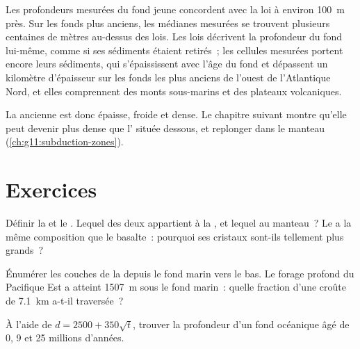 Les profondeurs mesurées du fond jeune concordent avec la loi à environ
\qty{100}{m} près. Sur les fonds plus anciens, les médianes mesurées se
trouvent plusieurs centaines de mètres au-dessus des lois. Les lois
décrivent la profondeur du fond lui-même, comme si ses sédiments étaient
retirés~; les cellules mesurées portent encore leurs sédiments, qui
s'épaississent avec l'âge du fond et dépassent un kilomètre d'épaisseur sur
les fonds les plus anciens de l'ouest de l'Atlantique Nord, et elles
comprennent des monts sous-marins et des plateaux volcaniques.

La  ancienne est donc épaisse, froide et dense. Le
chapitre suivant montre qu'elle peut devenir plus dense que l'
située dessous, et replonger dans le manteau (\cref{ch:g11:subduction-zones}).

\section{Exercices}

\begin{exercise}[$\star$]\label{exo:g11:ocean-ridges:1}
Définir la  et le . Lequel des deux appartient à la , et lequel au manteau~? Le  a la même composition que le
basalte~: pourquoi ses cristaux sont-ils tellement plus grands~?
\end{exercise}

\begin{exercise}[$\star$]\label{exo:g11:ocean-ridges:2}
Énumérer les couches de la  depuis le fond marin vers
le bas. Le forage profond du Pacifique Est a atteint \qty{1507}{m} sous le
fond marin~: quelle fraction d'une croûte de \qty{7.1}{km} a-t-il
traversée~?
\end{exercise}

\begin{exercise}[$\star$]\label{exo:g11:ocean-ridges:3}
À l'aide de $d = 2500 + 350\sqrt{t}$, trouver la profondeur d'un fond
océanique âgé de 0, 9 et 25 millions d'années.
\end{exercise}

